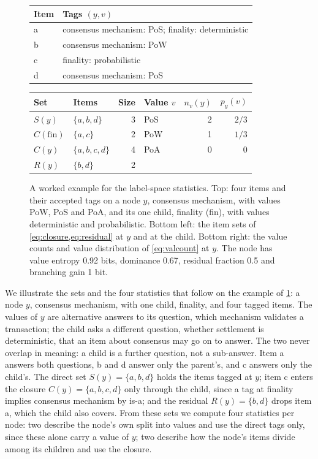 \begin{figure}[t]
  \centering
  \scriptsize
  \begin{tabular}{@{}ll@{}}
    \toprule
    Item & Tags $(y, v)$ \\
    \midrule
    a & consensus mechanism: PoS; \; finality: deterministic \\
    b & consensus mechanism: PoW \\
    c & finality: probabilistic \\
    d & consensus mechanism: PoS \\
    \bottomrule
  \end{tabular}
  \par\vspace{4pt}
  \begin{tabular}{@{}llr@{\qquad}lrr@{}}
    \toprule
    Set & Items & Size & Value $v$ & $n_v(y)$ & $p_y(v)$ \\
    \midrule
    $S(y)$              & $\{a, b, d\}$    & 3 & PoS & 2 & $2/3$ \\
    $C(\mathrm{fin})$   & $\{a, c\}$       & 2 & PoW & 1 & $1/3$ \\
    $C(y)$              & $\{a, b, c, d\}$ & 4 & PoA & 0 & $0$   \\
    $R(y)$              & $\{b, d\}$       & 2 &     &   &       \\
    \bottomrule
  \end{tabular}
  \caption{A worked example for the label-space statistics. Top: four items
  and their accepted tags on a node $y$, consensus mechanism, with values
  PoW, PoS and PoA, and its one child, finality (fin), with values
  deterministic and probabilistic. Bottom left: the item sets of
  \cref{eq:closure,eq:residual} at $y$ and at the child. Bottom right: the
  value counts and value distribution of \cref{eq:valcount} at $y$. The node
  has value entropy 0.92 bits, dominance 0.67, residual fraction 0.5 and
  branching gain 1 bit.}
  \label{fig:toylabel}
\end{figure}

We illustrate the sets and the four statistics that follow on the example of
\cref{fig:toylabel}: a node $y$, consensus mechanism, with one child,
finality, and four tagged items. The values of $y$ are alternative answers
to its question, which mechanism validates a transaction; the child asks a
different question, whether settlement is deterministic, that an item about
consensus may go on to answer. The two never overlap in meaning: a child is
a further question, not a sub-answer. Item a answers both questions, b and
d answer only the parent's, and c answers only the child's. The direct set
$S(y) = \{a, b, d\}$ holds the items tagged at $y$; item c enters the
closure $C(y) = \{a, b, c, d\}$ only through the child, since a tag at
finality implies consensus mechanism by is-a; and the residual
$R(y) = \{b, d\}$ drops item a, which the child also covers. From these
sets we compute four statistics per node: two describe the node's own
split into values and use the direct tags only, since these alone carry a
value of $y$; two describe how the node's items divide among its children
and use the closure.

